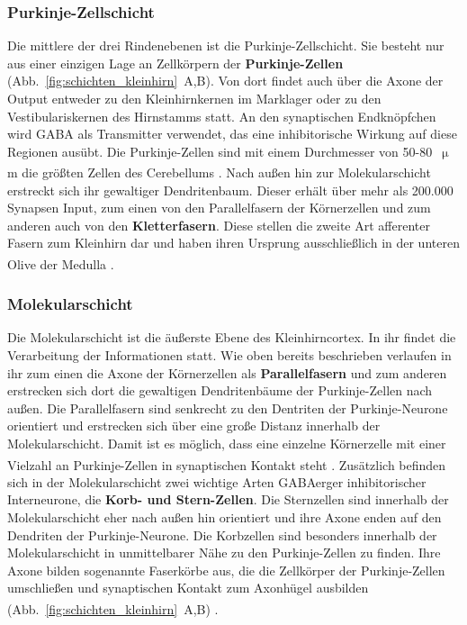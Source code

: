 \subsubsection*{Purkinje-Zellschicht} 
Die mittlere der drei Rindenebenen ist die Purkinje-Zellschicht. Sie besteht nur aus einer einzigen Lage an Zellkörpern der \textbf{Purkinje-Zellen} (Abb.~\ref{fig:schichten_kleinhirn}~A,B). Von dort findet auch über die Axone der Output entweder zu den Kleinhirnkernen im Marklager oder zu den Vestibulariskernen des Hirnstamms statt. An den synaptischen Endknöpfchen wird GABA als Transmitter verwendet, das eine inhibitorische Wirkung auf diese Regionen ausübt. Die Purkinje-Zellen sind mit einem Durchmesser von 50-80~$\upmu$m die größten Zellen des Cerebellums \textsuperscript{\cite[Kap.~42]{kandel2013principles}}. Nach außen hin zur Molekularschicht erstreckt sich ihr gewaltiger Dendritenbaum. Dieser erhält über mehr als 200.000 Synapsen Input, zum einen von den Parallelfasern der Körnerzellen und zum anderen auch von den \textbf{Kletterfasern}. Diese stellen die zweite Art afferenter Fasern zum Kleinhirn dar und haben ihren Ursprung ausschließlich in der unteren Olive der Medulla \textsuperscript{\cite[Kap.~7]{trepel2011neuroanatomie}}.   


\subsubsection*{Molekularschicht} 
Die Molekularschicht ist die äußerste Ebene des Kleinhirncortex. In ihr findet die Verarbeitung der Informationen statt. Wie oben bereits beschrieben verlaufen in ihr zum einen die Axone der Körnerzellen als \textbf{Parallelfasern} und zum anderen erstrecken sich dort die gewaltigen Dendritenbäume der Purkinje-Zellen nach außen. Die Parallelfasern sind senkrecht zu den Dentriten der Purkinje-Neurone orientiert und erstrecken sich über eine große Distanz innerhalb der Molekularschicht. Damit ist es möglich, dass eine einzelne Körnerzelle mit einer Vielzahl an Purkinje-Zellen in synaptischen Kontakt steht \textsuperscript{\cite[Kap.~42]{kandel2013principles}}. Zusätzlich befinden sich in der Molekularschicht zwei wichtige Arten GABAerger inhibitorischer Interneurone, die \textbf{Korb- und Stern-Zellen}. Die Sternzellen sind innerhalb der Molekularschicht eher nach außen hin orientiert und ihre Axone enden auf den Dendriten der Purkinje-Neurone. Die Korbzellen sind besonders innerhalb der Molekularschicht in unmittelbarer Nähe zu den Purkinje-Zellen zu finden. Ihre Axone bilden sogenannte Faserkörbe aus, die die Zellkörper der Purkinje-Zellen umschließen und synaptischen Kontakt zum Axonhügel ausbilden (Abb.~\ref{fig:schichten_kleinhirn}~A,B) \textsuperscript{\cite[Kap.~9]{paxinos2014rat}}.   


